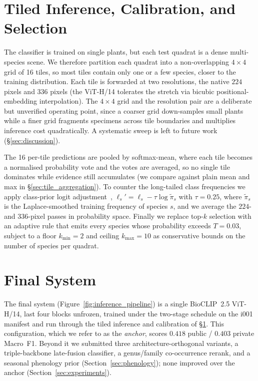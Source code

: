 \section{Tiled Inference, Calibration, and Selection}
\label{sec:adaptive_inference}

The classifier is trained on single plants, but each test quadrat is a dense multi-species scene. We therefore partition each quadrat into a non-overlapping $4{\times}4$ grid of 16 tiles, so most tiles contain only one or a few species, closer to the training distribution. Each tile is forwarded at two resolutions, the native $224$ pixels and $336$ pixels (the ViT-H/14 tolerates the stretch via bicubic positional-embedding interpolation). The $4{\times}4$ grid and the resolution pair are a deliberate but unverified operating point, since a coarser grid down-samples small plants while a finer grid fragments specimens across tile boundaries and multiplies inference cost quadratically. A systematic sweep is left to future work (\S\ref{sec:discussion}).

The 16 per-tile predictions are pooled by softmax-mean, where each tile becomes a normalised probability vote and the votes are averaged, so no single tile dominates while evidence still accumulates (we compare against plain mean and max in \S\ref{sec:tile_aggregation}). To counter the long-tailed class frequencies we apply class-prior logit adjustment~\cite{menon2021longtail}, $\ell_s' = \ell_s - \tau\log\tilde{\pi}_s$ with $\tau{=}0.25$, where $\tilde{\pi}_s$ is the Laplace-smoothed training frequency of species $s$, and we average the $224$- and $336$-pixel passes in probability space. Finally we replace top-$k$ selection with an adaptive rule that emits every species whose probability exceeds $T{=}0.03$, subject to a floor $k_{\min}{=}2$ and ceiling $k_{\max}{=}10$ as conservative bounds on the number of species per quadrat.

\section{Final System}
\label{sec:final_submission}

The final system (Figure~\ref{fig:inference_pipeline}) is a single BioCLIP~2.5 ViT-H/14, last four blocks unfrozen, trained under the two-stage schedule on the i001 manifest and run through the tiled inference and calibration of \S\ref{sec:adaptive_inference}. This configuration, which we refer to as the \emph{anchor}, scores $0.418$ public / $0.403$ private Macro~F1. Beyond it we submitted three architecture-orthogonal variants, a triple-backbone late-fusion classifier, a genus/family co-occurrence rerank, and a seasonal phenology prior (Section~\ref{sec:phenology}); none improved over the anchor (Section~\ref{sec:experiments}).

